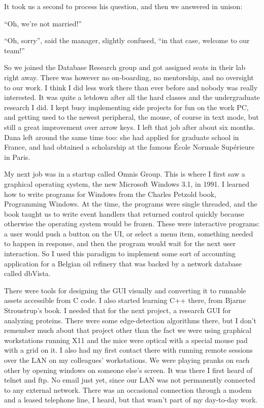 \documentclass[12pt]{book}
\begin{document}
It took us a second to process his question, and then we answered in
unison:

``Oh, we're not married!''

``Oh, sorry'', said the manager, slightly confused, ``in that case,
welcome to our team!''

So we joined the Database Research group and got assigned seats in their
lab right away. There was however no on-boarding, no mentorship, and no
oversight to our work. I think I did less work there than ever before
and nobody was really interested. It was quite a letdown after all the
hard classes and the undergraduate research I did. I kept busy
implementing side projects for fun on the work PC, and getting used to
the newest peripheral, the mouse, of course in text mode, but still a
great improvement over arrow keys. I left that job after about six
months. Dana left around the same time too: she had applied for graduate
school in France, and had obtained a scholarship at the famous École
Normale Supérieure in Paris.

My next job was in a startup called Omnis Group. This is where I first
saw a graphical operating system, the new Microsoft Windows 3.1, in
1991. I learned how to write programs for Windows from the Charles
Petzold book, Programming Windows. At the time, the programs were single
threaded, and the book taught us to write event handlers that returned
control quickly because otherwise the operating system would be frozen.
These were interactive programs: a user would push a button on the UI,
or select a menu item, something needed to happen in response, and then
the program would wait for the next user interaction. So I used this
paradigm to implement some sort of accounting application for a Belgian
oil refinery that was backed by a network database called dbVista.

There were tools for designing the GUI visually and converting it to
runnable assets accessible from C code. I also started learning C++
there, from Bjarne Stroustrup's book. I needed that for the next
project, a research GUI for analyzing proteins. There were some
edge-detection algorithms there, but I don't remember much about that
project other than the fact we were using graphical workstations running
X11 and the mice were optical with a special mouse pad with a grid on
it. I also had my first contact there with running remote sessions over
the LAN on my colleagues' workstations. We were playing pranks on each
other by opening windows on someone else's screen. It was there I first
heard of telnet and ftp. No email just yet, since our LAN was not
permanently connected to any external network. There was an occasional
connection through a modem and a leased telephone line, I heard, but
that wasn't part of my day-to-day work.
\end{document}
